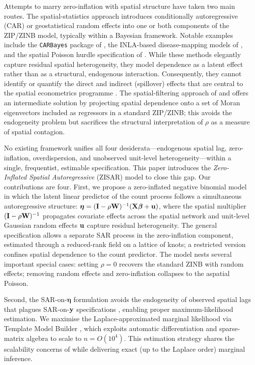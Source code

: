 Attempts to marry zero-inflation with spatial structure have taken two main routes.
The spatial-statistics approach introduces conditionally autoregressive (CAR) or geostatistical random effects into one or both components of the ZIP/ZINB model, typically within a Bayesian framework.
Notable examples include the \texttt{CARBayes} package of \citet{lee2013}, the INLA-based disease-mapping models of \citet{asmarian2019}, and the spatial Poisson hurdle specification of \citet{neelon2013}.
While these methods elegantly capture residual spatial heterogeneity, they model dependence as a latent effect rather than as a structural, endogenous interaction.
Consequently, they cannot identify or quantify the direct and indirect (spillover) effects that are central to the spatial econometrics programme \citep{lesage_pace2009,lesage_pace2014}.
The spatial-filtering approach of \citet{metulini2018} and \citet{griffith2003} offers an intermediate solution by projecting spatial dependence onto a set of Moran eigenvectors included as regressors in a standard ZIP/ZINB; this avoids the endogeneity problem but sacrifices the structural interpretation of $\rho$ as a measure of spatial contagion.

No existing framework unifies all four desiderata---endogenous spatial lag, zero-inflation, overdispersion, and unobserved unit-level heterogeneity---within a single, frequentist, estimable specification.
This paper introduces the \emph{Zero-Inflated Spatial Autoregressive} (ZISAR) model to close this gap.
Our contributions are four.
First, we propose a zero-inflated negative binomial model in which the latent linear predictor of the count process follows a simultaneous autoregressive structure: $\boldsymbol{\eta} = (\mathbf{I} - \rho\mathbf{W})^{-1}(\mathbf{X}\boldsymbol{\beta} + \mathbf{u})$, where the spatial multiplier $(\mathbf{I} - \rho\mathbf{W})^{-1}$ propagates covariate effects across the spatial network and unit-level Gaussian random effects $\mathbf{u}$ capture residual heterogeneity.
The general specification allows a separate SAR process in the zero-inflation component, estimated through a reduced-rank field on a lattice of knots; a restricted version confines spatial dependence to the count predictor.
The model nests several important special cases: setting $\rho=0$ recovers the standard ZINB with random effects; removing random effects and zero-inflation collapses to the aspatial Poisson.

Second, the SAR-on-$\boldsymbol{\eta}$ formulation avoids the endogeneity of observed spatial lags that plagues SAR-on-$\mathbf{y}$ specifications \citep{lambert2010}, enabling proper maximum-likelihood estimation.
We maximise the Laplace-approximated marginal likelihood via Template Model Builder \citep[\texttt{TMB};][]{kristensen2016}, which exploits automatic differentiation and sparse-matrix algebra to scale to $n = O(10^4)$.
This estimation strategy shares the scalability concerns of \citet{arbia_nardelli2024} while delivering exact (up to the Laplace order) marginal inference.

